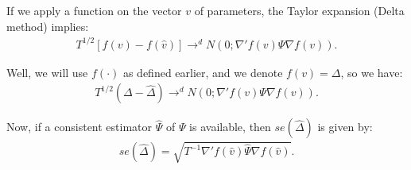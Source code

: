 \documentclass[12pt,oneside,a4paper]{article}
\begin{document}
If we apply a function on the vector $v$ of parameters, the Taylor expansion (Delta method) implies:
\begin{align*}
	T^{1/2}[f(v) - f(\hat{v})] \to^d N \left( 0; \nabla'f(v) \Psi \nabla f(v)  \right).
\end{align*}

Well, we will use $f(\cdot)$ as defined earlier, and we denote $f(v) = \Delta$, so we have:
\begin{align*}
T^{1/2}(\Delta - \hat{\Delta}) 	\to^d N \left( 0; \nabla'f(v) \Psi \nabla f(v)  \right).
\end{align*}

Now, if a consistent estimator $\hat{\Psi}$ of $\Psi$ is available, then $se(\hat{\Delta})$ is given by:
\begin{align}
	se(\hat{\Delta}) = \sqrt{T^{-1} \nabla'f(\hat{v}) \hat{\Psi} \nabla f(\hat{v})}.
\end{align}

\clearpage
\renewcommand\bibname{REFERENCES} 


\end{document}
